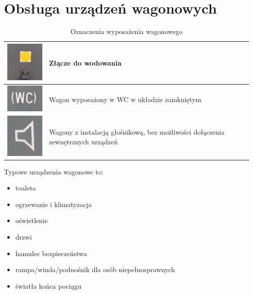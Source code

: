 \chapter{Obsługa urządzeń wagonowych}
\begin{table}
	\caption{Oznaczenia wyposażenia wagonowego}
	\label{tab:opisywagonowe}
	\begin{tabular}{|c|m{8cm}|}
		\hline
		\includegraphics[width=2.5cm]{skryptkierownik-img/skryptkierownik-img035.jpg} & Złącze do wodowania\\
		\hline
		\includegraphics[width=2.5cm]{skryptkierownik-img/skryptkierownik-img036.jpg} & Wagon wyposażony w WC w układzie zamkniętym\\
		\hline
		\includegraphics[width=2.5cm]{skryptkierownik-img/skryptkierownik-img037.jpg} & Wagony z instalacją głośnikową, bez możliwości dołączenia zewnętrznych urządzeń\\\hline
	\end{tabular}
\end{table}
Typowe urządzenia wagonowe to:
\begin{itemize}
	\item toaleta
	\item ogrzewanie i klimatyzacja
	\item oświetlenie
	\item drzwi
	\item hamulec bezpieczeństwa
	\item rampa/winda/podnośnik dla osób niepełnosprawnych
	\item światła końca pociągu
\end{itemize}


